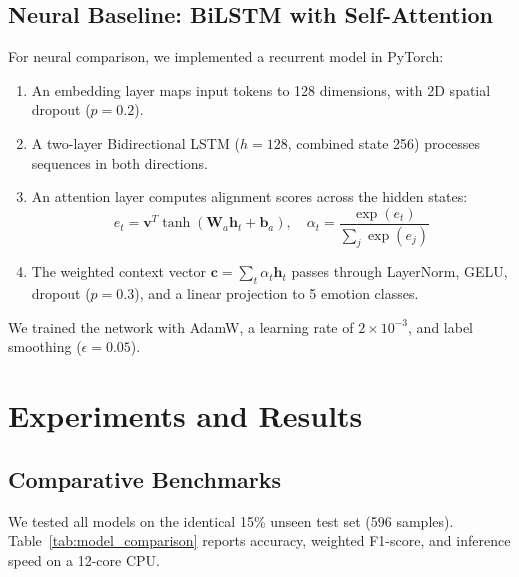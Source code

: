 \documentclass[conference]{IEEEtran}
\begin{document}
\subsection{Neural Baseline: BiLSTM with Self-Attention}
For neural comparison, we implemented a recurrent model in PyTorch:
\begin{enumerate}
    \item An embedding layer maps input tokens to 128 dimensions, with 2D spatial dropout ($p=0.2$).
    \item A two-layer Bidirectional LSTM ($h=128$, combined state 256) processes sequences in both directions.
    \item An attention layer computes alignment scores across the hidden states:
    \begin{equation}
        e_t = \mathbf{v}^T \tanh(\mathbf{W}_a \mathbf{h}_t + \mathbf{b}_a), \quad \alpha_t = \frac{\exp(e_t)}{\sum_j \exp(e_j)}
    \end{equation}
    \item The weighted context vector $\mathbf{c} = \sum_t \alpha_t \mathbf{h}_t$ passes through LayerNorm, GELU, dropout ($p=0.3$), and a linear projection to 5 emotion classes.
\end{enumerate}
We trained the network with AdamW, a learning rate of $2 \times 10^{-3}$, and label smoothing ($\epsilon=0.05$).

\section{Experiments and Results}

\subsection{Comparative Benchmarks}
We tested all models on the identical 15\% unseen test set (596 samples). Table~\ref{tab:model_comparison} reports accuracy, weighted F1-score, and inference speed on a 12-core CPU.
\end{document}
